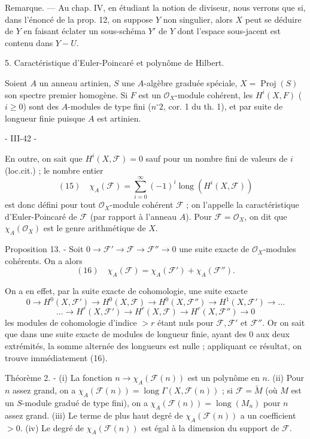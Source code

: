 Remarque. — Au chap. IV, en étudiant la notion de diviseur, nous verrons que si, dans l'énoncé de la prop. 12, on suppose $Y$ non singulier, alors $X$ peut se déduire de $Y$ en faisant éclater un sous-schéma $Y'$ de $Y$ dont l'espace sous-jacent est contenu dans $Y - U$.


5. Caractéristique d'Euler-Poincaré et polynôme de Hilbert.

Soient $A$ un anneau artinien, $S$ une $A$-algèbre graduée spéciale, $X = \operatorname{Proj}(S)$ son spectre premier homogène. Si $F$ est un $\mathcal{O}_X$-module cohérent, les $H^i(X, F)$ ($i \ge 0$) sont des $A$-modules de type fini ($n^\circ 2$, cor. 1 du th. 1), et par suite de longueur finie puisque $A$ est artinien.

\newpage


- III-42 -

En outre, on sait que $H^i(X, \mathcal{F}) = 0$ sauf pour un nombre fini de valeurs de $i$ (loc.cit.) ; le nombre entier
$$(15) \quad \chi_A(\mathcal{F}) = \sum_{i=0}^{\infty} (-1)^i \operatorname{long}(H^i(X, \mathcal{F}))$$
est donc défini pour tout $\mathcal{O}_X$-module cohérent $\mathcal{F}$ ; on l'appelle la caractéristique d'Euler-Poincaré de $\mathcal{F}$ (par rapport à l'anneau $A$). Pour $\mathcal{F} = \mathcal{O}_X$, on dit que $\chi_A(\mathcal{O}_X)$ est le genre arithmétique de $X$.

Proposition 13. - Soit $0 \to \mathcal{F}' \to \mathcal{F} \to \mathcal{F}'' \to 0$ une suite exacte de $\mathcal{O}_X$-modules cohérents. On a alors
$$(16) \quad \chi_A(\mathcal{F}) = \chi_A(\mathcal{F}') + \chi_A(\mathcal{F}'').$$

On a en effet, par la suite exacte de cohomologie, une suite exacte
$$0 \to H^0(X, \mathcal{F}') \to H^0(X, \mathcal{F}) \to H^0(X, \mathcal{F}'') \to H^1(X, \mathcal{F}') \to \dots$$
$$\dots \to H^r(X, \mathcal{F}') \to H^r(X, \mathcal{F}) \to H^r(X, \mathcal{F}'') \to 0$$
les modules de cohomologie d'indice $> r$ étant nuls pour $\mathcal{F}, \mathcal{F}'$ et $\mathcal{F}''$. Or on sait que dans une suite exacte de modules de longueur finie, ayant des $0$ aux deux extrémités, la somme alternée des longueurs est nulle ; appliquant ce résultat, on trouve immédiatement (16).

Théorème 2. - (i) La fonction $n \to \chi_A(\mathcal{F}(n))$ est un polynôme en $n$.
(ii) Pour $n$ assez grand, on a $\chi_A(\mathcal{F}(n)) = \operatorname{long} \Gamma(X, \mathcal{F}(n))$ ; si $\mathcal{F} = \widetilde{M}$ (où $M$ est un $S$-module gradué de type fini), on a $\chi_A(\mathcal{F}(n)) = \operatorname{long}(M_n)$ pour $n$ assez grand.
(iii) Le terme de plus haut degré de $\chi_A(\mathcal{F}(n))$ a un coefficient $> 0$.
(iv) Le degré de $\chi_A(\mathcal{F}(n))$ est égal à la dimension du support de $\mathcal{F}$.

